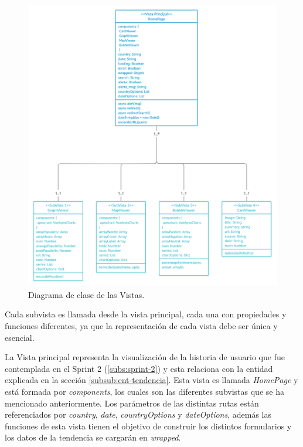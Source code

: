 \begin{figure}[H]
    \centering
    \myfloatalign
    \includegraphics[width=1\textwidth]{gfx/Diagrama-de-Vistas.png}
    \caption[Diagrama de clase de las Vistas]{Diagrama de clase de las Vistas.}\label{gfx:Diagrama-de-Vistas}
\end{figure}

Cada subvista es llamada desde la vista principal, cada una con propiedades y funciones diferentes, ya que la representación de cada vista debe ser única y esencial.

\vspace{0.3cm}

La Vista principal representa la visualización de la historia de usuario que fue contemplada en el Sprint 2 (\ref{subs:sprint-2}) y esta relaciona con la entidad explicada en la sección \ref{subsub:ent-tendencia}. Esta vista es llamada \textit{HomePage} y está formada por \textit{components}, los cuales son las diferentes subvistas que se ha mencionado anteriormente. Los parámetros de las distintas rutas están referenciados por \textit{country}, \textit{date}, \textit{countryOptions} y \textit{dateOptions}, además las funciones de esta vista tienen el objetivo de construir los distintos formularios y los datos de la tendencia se cargarán en \textit{wrapped}.

